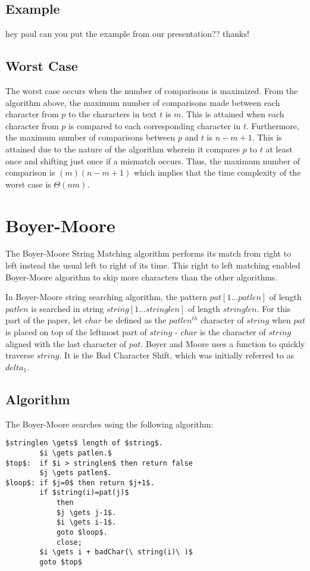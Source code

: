 \subsection{Example}
hey paul can you put the example from our presentation?? thanks!
\subsection{Worst Case}    
The worst case occurs when the number of comparisons is maximized. From the algorithm above, the maximum number of comparisons made between each character from $p$ to the characters in text $t$ is $m$. This is attained when each character from $p$ is compared to each corresponding character in $t$. Furthermore, the maximum number of comparisons between $p$ and $t$ is $n-m+1$. This is attained due to the nature of the algorithm wherein it compares $p$ to $t$ at least once and shifting just once if a mismatch occurs. Thus, the maximum number of comparison is $(m)(n-m+1)$ which implies that the time complexity of the worst case is $\Theta(nm)$.

\section{Boyer-Moore}		%
The Boyer-Moore String Matching algorithm performs its match from right to left instead the usual left to right of its time. This right to left matching enabled Boyer-Moore algorithm to skip more characters than the other algorithms\cite{boyerMoore}.

In Boyer-Moore string searching algorithm, the pattern $pat[1 ... patlen]$ of length $patlen$ is searched in string $string[1 ... stringlen]$ of length $stringlen$. For this part of the paper, let $char$ be defined as the $patlen^{th}$ character of $string$ when $pat$ is placed on top of the leftmost part of $string$ - $char$ is the character of $string$ aligned with the last character of $pat$. Boyer and Moore uses a function to quickly traverse $string$. It is the Bad Character Shift, which was initially referred to as $delta_1$.\cite{boyerMoore}

\subsection{Algorithm}
The Boyer-Moore searches using the following algorithm:
\begin{lstlisting}[mathescape=true]
		$stringlen \gets$ length of $string$.
		$i \gets patlen.$
$top$:	if $i > stringlen$ then return false
		$j \gets patlen$.
$loop$:	if $j=0$ then return $j+1$.
		if $string(i)=pat(j)$
			then
			$j \gets j-1$.
			$i \gets i-1$.
			goto $loop$.
			close;
		$i \gets i + badChar(\ string(i)\ )$
		goto $top$
\end{lstlisting}

